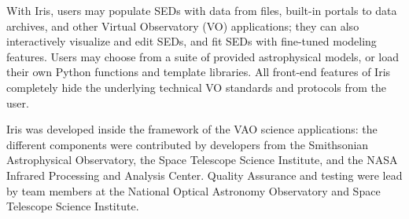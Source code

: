 \documentclass[final,5p]{elsarticle}
\begin{document}
With Iris, users may populate SEDs with data from files, built-in portals to data archives, and other Virtual Observatory (VO) applications; they can also interactively visualize and edit SEDs, and fit SEDs with fine-tuned modeling features. Users may choose from a suite of provided astrophysical models, or load their own Python functions and template libraries. All front-end features of Iris completely hide the underlying technical VO standards and protocols from the user.




Iris was developed inside the framework of the VAO science applications: the different components were contributed by developers from the Smithsonian Astrophysical Observatory, the Space Telescope Science Institute, and the NASA Infrared Processing and Analysis Center. Quality Assurance and testing were lead by team members at the National Optical Astronomy Observatory and Space Telescope Science Institute.
\end{document}
